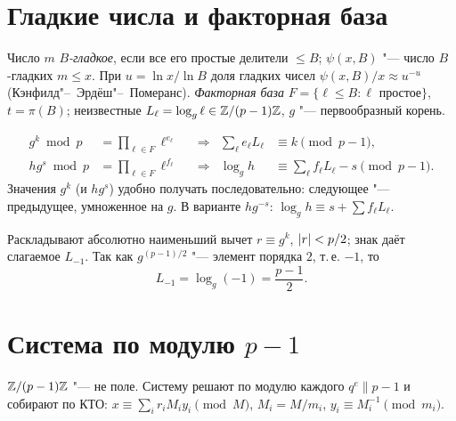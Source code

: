 \documentclass{ca-handout}
\begin{document}
\makehandouttitle

\section{Гладкие числа и факторная база}
Число $m$ \emph{$B$-гладкое}, если все его простые делители $\le B$; $\psi(x, B)$ "--- число
$B$-гладких $m \le x$. При $u = \ln x / \ln B$ доля гладких чисел $\psi(x, B)/x \approx u^{-u}$
(Кэнфилд"--~Эрдёш"--~Померанс). \emph{Факторная база} $F = \{\ell \le B : \ell \text{ простое}\}$,
$t = \pi(B)$; неизвестные $L_\ell = \log_g \ell \in \mathbb{Z}/(p - 1)\mathbb{Z}$, $g$ "--- первообразный корень.

\begin{reminder}[title={Соотношение и логарифм элемента}]
\[
\begin{aligned}
  g^k \bmod p &= \prod_{\ell \in F} \ell^{e_\ell} &&\Longrightarrow&
  \sum_{\ell} e_\ell L_\ell &\equiv k \pmod{p - 1},\\
  h g^{s} \bmod p &= \prod_{\ell \in F} \ell^{f_\ell} &&\Longrightarrow&
  \log_g h &\equiv \sum_{\ell} f_\ell L_\ell - s \pmod{p - 1}.
\end{aligned}
\]
Значения $g^k$ (и $h g^s$) удобно получать последовательно: следующее "--- предыдущее, умноженное
на $g$. В варианте $h g^{-s}$: $\log_g h \equiv s + \sum f_\ell L_\ell$.
\end{reminder}

\begin{reminder}[title={Факторная база с $-1$}]
Раскладывают абсолютно наименьший вычет $r \equiv g^k$, $\lvert r\rvert < p/2$; знак даёт слагаемое
$L_{-1}$. Так как $g^{(p-1)/2}$ "--- элемент порядка $2$, т.\,е. $-1$, то
\[
  L_{-1} = \log_g(-1) = \frac{p - 1}{2}.
\]
\end{reminder}

\section{Система по модулю \texorpdfstring{$p - 1$}{p - 1}}
$\mathbb{Z}/(p-1)\mathbb{Z}$ "--- не поле. Систему решают по модулю каждого $q^e \parallel p - 1$ и собирают
по КТО: $x \equiv \sum_i r_i M_i y_i \pmod M$, $M_i = M/m_i$, $y_i \equiv M_i^{-1} \pmod{m_i}$.
\end{document}
